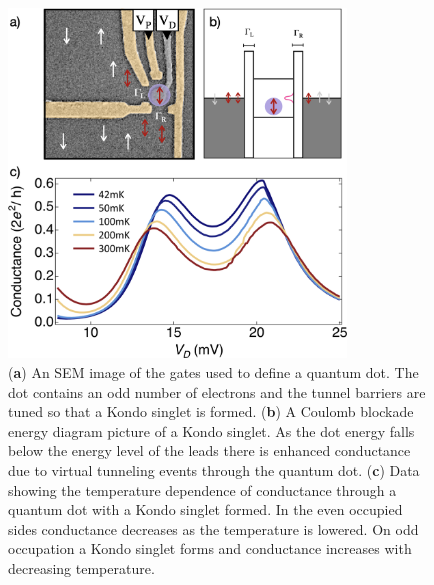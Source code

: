 \begin{figure}[ht]
  \begin{center}
    \includegraphics[width=0.8\textwidth]{figures/ch2/crop_PosterFiguresMaster.008.png}
    \caption[Kondo effect in a quantum dot in the Kondo regime]{\label{fig:ch2/kondo_regime_conductance} 
    (\textbf{a}) An SEM image of the gates used to define a quantum dot. The dot contains an odd number of electrons and the tunnel barriers are tuned so that a Kondo singlet is formed. (\textbf{b}) A Coulomb blockade energy diagram picture of a Kondo singlet. As the dot energy falls below the energy level of the leads there is enhanced conductance due to virtual tunneling events through the quantum dot. (\textbf{c}) Data showing the temperature dependence of conductance through a quantum dot with a Kondo singlet formed. In the even occupied sides conductance decreases as the temperature is lowered. On odd occupation a Kondo singlet forms and conductance increases with decreasing temperature.}
  \end{center}
\end{figure}